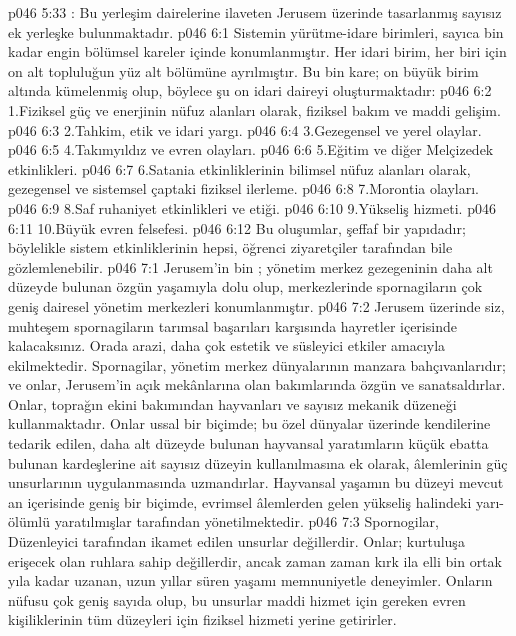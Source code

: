 \vs p046 5:33 : Bu yerleşim dairelerine ilaveten Jerusem üzerinde tasarlanmış sayısız ek yerleşke bulunmaktadır.
\vs p046 6:1 Sistemin yürütme\hyp{}idare birimleri, sayıca bin kadar engin bölümsel kareler içinde konumlanmıştır. Her idari birim, her biri için on alt topluluğun yüz alt bölümüne ayrılmıştır. Bu bin kare; on büyük birim altında kümelenmiş olup, böylece şu on idari daireyi oluşturmaktadır:
\vs p046 6:2 1.\bibnobreakspace Fiziksel güç ve enerjinin nüfuz alanları olarak, fiziksel bakım ve maddi gelişim.
\vs p046 6:3 2.\bibnobreakspace Tahkim, etik ve idari yargı.
\vs p046 6:4 3.\bibnobreakspace Gezegensel ve yerel olaylar.
\vs p046 6:5 4.\bibnobreakspace Takımyıldız ve evren olayları.
\vs p046 6:6 5.\bibnobreakspace Eğitim ve diğer Melçizedek etkinlikleri.
\vs p046 6:7 6.\bibnobreakspace Satania etkinliklerinin bilimsel nüfuz alanları olarak, gezegensel ve sistemsel çaptaki fiziksel ilerleme.
\vs p046 6:8 7.\bibnobreakspace Morontia olayları.
\vs p046 6:9 8.\bibnobreakspace Saf ruhaniyet etkinlikleri ve etiği.
\vs p046 6:10 9.\bibnobreakspace Yükseliş hizmeti.
\vs p046 6:11 10.\bibnobreakspace Büyük evren felsefesi.
\vs p046 6:12 Bu oluşumlar, şeffaf bir yapıdadır; böylelikle sistem etkinliklerinin hepsi, öğrenci ziyaretçiler tarafından bile gözlemlenebilir.
\vs p046 7:1 Jerusem’in bin ; yönetim merkez gezegeninin daha alt düzeyde bulunan özgün yaşamıyla dolu olup, merkezlerinde spornagiların çok geniş dairesel yönetim merkezleri konumlanmıştır.
\vs p046 7:2 Jerusem üzerinde siz, muhteşem spornagiların tarımsal başarıları karşısında hayretler içerisinde kalacaksınız. Orada arazi, daha çok estetik ve süsleyici etkiler amacıyla ekilmektedir. Spornagilar, yönetim merkez dünyalarının manzara bahçıvanlarıdır; ve onlar, Jerusem’in açık mekânlarına olan bakımlarında özgün ve sanatsaldırlar. Onlar, toprağın ekini bakımından hayvanları ve sayısız mekanik düzeneği kullanmaktadır. Onlar ussal bir biçimde; bu özel dünyalar üzerinde kendilerine tedarik edilen, daha alt düzeyde bulunan hayvansal yaratımların küçük ebatta bulunan kardeşlerine ait sayısız düzeyin kullanılmasına ek olarak, âlemlerinin güç unsurlarının uygulanmasında uzmandırlar. Hayvansal yaşamın bu düzeyi mevcut an içerisinde geniş bir biçimde, evrimsel âlemlerden gelen yükseliş halindeki yarı\hyp{}ölümlü yaratılmışlar tarafından yönetilmektedir.
\vs p046 7:3 Spornogilar, Düzenleyici tarafından ikamet edilen unsurlar değillerdir. Onlar; kurtuluşa erişecek olan ruhlara sahip değillerdir, ancak zaman zaman kırk ila elli bin ortak yıla kadar uzanan, uzun yıllar süren yaşamı memnuniyetle deneyimler. Onların nüfusu çok geniş sayıda olup, bu unsurlar maddi hizmet için gereken evren kişiliklerinin tüm düzeyleri için fiziksel hizmeti yerine getirirler.

